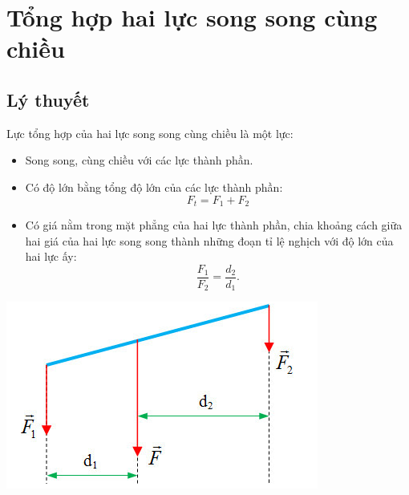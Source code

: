 \let\lesson\undefined
\newcommand{\lesson}{\phantomlesson{Bài 13: Tổng hợp lực song song cùng chiều}}
\chapter[Tổng hợp hai lực song song cùng chiều]{Tổng hợp hai lực song song cùng chiều}
\setcounter{section}{0}
\section{Lý thuyết}
Lực tổng hợp của hai lực song song cùng chiều là một lực:
\begin{itemize}
	\item Song song, cùng chiều với các lực thành phần.
	\item Có độ lớn bằng tổng độ lớn của các lực thành phần:
	$$F_t=F_1+F_2$$
	\item Có giá nằm trong mặt phẳng của hai lực thành phần, chia khoảng cách giữa hai giá của hai lực song song thành những đoạn tỉ lệ nghịch với độ lớn của hai lực ấy:
	$$\dfrac{F_1}{F_2}=\dfrac{d_2}{d_1}.$$
\end{itemize}
\begin{center}
	\includegraphics[width=0.35\linewidth]{../figs/VN10-2023-PH-TP022-2}
\end{center}
